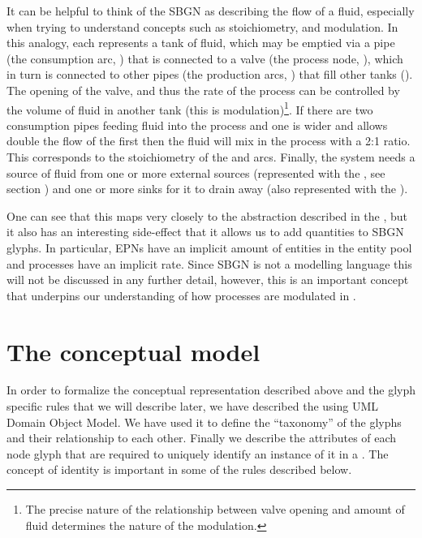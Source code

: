 It can be helpful to think of the SBGN \PD as describing the flow of a fluid, especially when trying to understand concepts such as stoichiometry, and modulation. In this analogy, each  represents a tank of fluid, which may be emptied via a pipe (the consumption arc, ) that is connected to a valve (the process node, ), which in turn is connected to other pipes (the production arcs, ) that fill other tanks (). The opening of the valve, and thus the rate of the process can be controlled by the volume of fluid in another tank (this is modulation)\footnote{The precise nature of the relationship between valve opening and amount of fluid determines the nature of the modulation.}. If there are two consumption pipes feeding fluid into the process and one is wider and allows double the flow of the first then the fluid will mix in the process with a 2:1 ratio. This corresponds to the stoichiometry of the  and  arcs. Finally, the system needs a source of fluid from one or more external sources (represented with the , see section ) and one or more sinks for it to drain away (also represented with the ).

One can see that this maps very closely to the abstraction described in the \PDl, but it also has an interesting side-effect that it allows us to add quantities to SBGN glyphs. In particular, EPNs have an implicit amount of entities in the entity pool and processes have an implicit rate. Since SBGN \PD is not a modelling language this will not be discussed in any further detail, however, this is an important concept that underpins our understanding of how processes are modulated in .

\section{The conceptual model}
\label{sec:conceptual-model}

In order to formalize the conceptual representation described above and the glyph specific rules that we will describe later, we have described the \PDl using UML Domain Object Model. We have used it to define the ``taxonomy'' of the \PD glyphs and their relationship to each other. Finally we describe the attributes of each node glyph that are required to uniquely identify an instance of it in a \PDm. The concept of identity is important in some of the rules described below.

